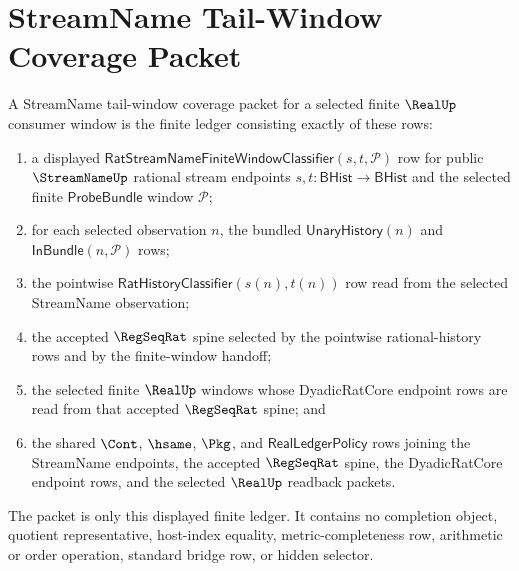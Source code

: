 \section{StreamName Tail-Window Coverage Packet}
\label{sec:streamname-tail-window-coverage-packet}

\begin{definition}
\label{def:streamname-tail-window-coverage-packet}
A StreamName tail-window coverage packet for a selected finite $\RealUp$
consumer window is the finite ledger consisting exactly of these rows:
\begin{enumerate}
\item a displayed
$\mathsf{RatStreamNameFiniteWindowClassifier}(s,t,\mathcal P)$ row for public
$\StreamNameUp$ rational stream endpoints $s,t:\mathsf{BHist}\to\mathsf{BHist}$
and the selected finite $\mathsf{ProbeBundle}$ window $\mathcal P$;
\item for each selected observation $n$, the bundled
$\mathsf{UnaryHistory}(n)$ and $\mathsf{InBundle}(n,\mathcal P)$ rows;
\item the pointwise $\mathsf{RatHistoryClassifier}(s(n),t(n))$ row read from
the selected StreamName observation;
\item the accepted $\RegSeqRat$ spine selected by the pointwise rational-history
rows and by the finite-window handoff;
\item the selected finite $\RealUp$ windows whose DyadicRatCore endpoint rows
are read from that accepted $\RegSeqRat$ spine; and
\item the shared $\Cont$, $\hsame$, $\Pkg$, and
$\mathsf{RealLedgerPolicy}$ rows joining the StreamName endpoints, the accepted
$\RegSeqRat$ spine, the DyadicRatCore endpoint rows, and the selected $\RealUp$
readback packets.
\end{enumerate}

The packet is only this displayed finite ledger. It contains no completion
object, quotient representative, host-index equality, metric-completeness row,
arithmetic or order operation, standard bridge row, or hidden selector.
\end{definition}

